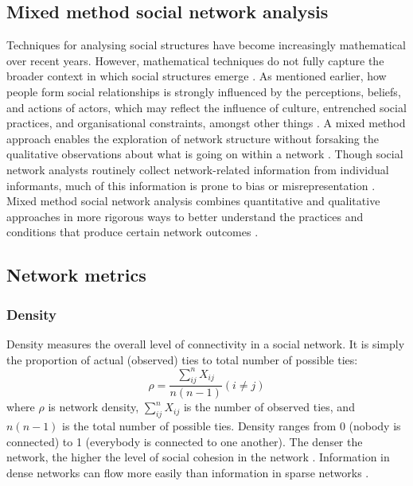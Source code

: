 \subsection{Mixed method social network analysis}

Techniques for analysing social structures have become increasingly mathematical over recent years. However, mathematical techniques do not fully capture the broader context in which social structures emerge \citep{edwards2010esrc}. As mentioned earlier, how people form social relationships is strongly influenced by the perceptions, beliefs, and actions of actors, which may reflect the influence of culture, entrenched social practices, and organisational constraints, amongst other things \citep{dominguez2014mixed}. A mixed method approach enables the exploration of network structure without forsaking the qualitative observations about what is going on within a network \citep{crossley2015cases}. Though social network analysts routinely collect network-related information from individual informants, much of this information is prone to bias or misrepresentation \citep{williams2017mixed}. Mixed method social network analysis combines quantitative and qualitative approaches in more rigorous ways to better understand the practices and conditions that produce certain network outcomes \citep{dominguez2014mixed}. \medskip


\subsection{Network metrics}

\subsubsection{Density}

Density measures the overall level of connectivity in a social network. It is simply the proportion of actual (observed) ties to total number of possible ties:  $$\rho = \frac{\sum_{ij}^{n}X_{ij}}{n(n-1)}(i \neq j)$$ where $\rho$ is network density, $\sum_{ij}^{n}X_{ij}$ is the number of observed ties, and $n(n-1)$ is the total number of possible ties. Density ranges from 0 (nobody is connected) to 1 (everybody is connected to one another). The denser the network, the higher the level of social cohesion in the network \citep{newman2010networks}. Information in dense networks can flow more easily than information in sparse networks \citep{borgatti2013analyzing}. \medskip

